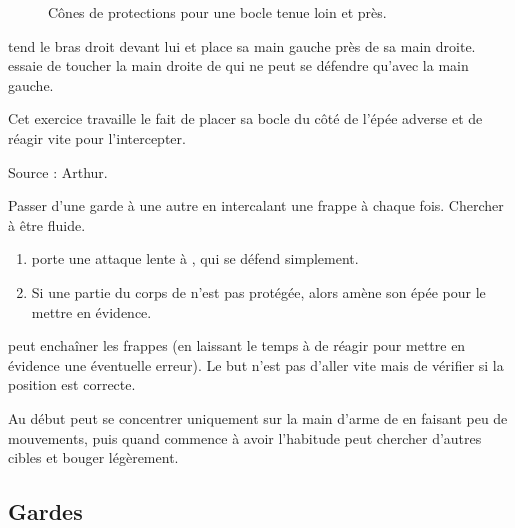 \begin{figure}[ht]
	\centering
	\hspace{1cm}
	\caption{Cônes de protections pour une bocle tenue loin et près.}
	\label{épée-bocle:fig:bocle-cone}
\end{figure}


\begin{exercice}

\D tend le bras droit devant lui et place sa main gauche près de sa main droite. 
\A essaie de toucher la main droite de \D qui ne peut se défendre qu'avec la main gauche.

Cet exercice travaille le fait de placer sa bocle du côté de l'épée adverse et de réagir vite pour l'intercepter.

Source : Arthur.

\end{exercice}


\begin{exercice}

Passer d'une garde à une autre en intercalant une frappe à chaque fois.
Chercher à être fluide.

\end{exercice}


\begin{exercice}

\begin{enumerate}
	\item \A porte une attaque lente à \D, qui se défend simplement.
	\item Si une partie du corps de \A n'est pas protégée, alors \D amène son épée pour le mettre en évidence.
\end{enumerate}

\A peut enchaîner les frappes (en laissant le temps à \D de réagir pour mettre en évidence une éventuelle erreur).
Le but n'est pas d'aller vite mais de vérifier si la position est correcte.

Au début \D peut se concentrer uniquement sur la main d'arme de \A en faisant peu de mouvements, puis quand \A commence à avoir l'habitude \D peut chercher d'autres cibles et bouger légèrement.

\end{exercice}


\subsection{Gardes}


